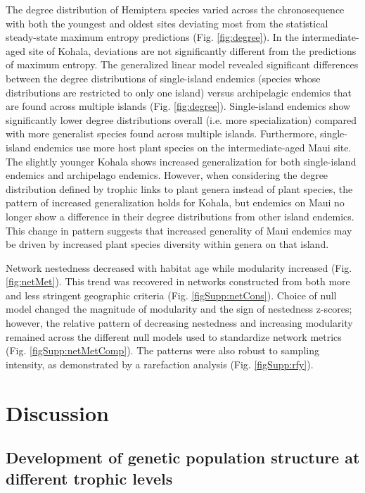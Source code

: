 The degree distribution of Hemiptera species varied across the
chronosequence with both the youngest and oldest sites deviating most
from the statistical steady-state maximum entropy predictions
(Fig. \ref{fig:degree}). In the intermediate-aged site of Kohala,
deviations are not significantly different from the predictions of
maximum entropy.  The generalized linear model revealed significant
differences between the degree distributions of single-island endemics
(species whose distributions are restricted to only one island) versus
archipelagic endemics that are found across multiple islands
(Fig. \ref{fig:degree}). Single-island endemics show significantly lower degree
distributions overall (i.e. more specialization) compared with more
generalist species found across multiple islands. Furthermore,
single-island endemics use more host plant species on the
intermediate-aged Maui site. The slightly younger Kohala shows
increased generalization for both single-island endemics and
archipelago endemics. However, when considering the degree
distribution defined by trophic links to plant genera instead of plant
species, the pattern of increased generalization holds for Kohala, but
endemics on Maui no longer show a difference in their degree
distributions from other island endemics. This change in pattern
suggests that increased generality of Maui endemics may be driven by
increased plant species diversity within genera on that island.

Network nestedness decreased with habitat age while modularity
increased (Fig. \ref{fig:netMet}). This trend was recovered in
networks constructed from both more and less stringent geographic
criteria (Fig. \ref{figSupp:netCons}). Choice of null model changed
the magnitude of modularity and the sign of nestedness z-scores;
however, the relative pattern of decreasing nestedness and increasing
modularity remained across the different null models used to
standardize network metrics (Fig. \ref{figSupp:netMetComp}). The
patterns were also robust to sampling intensity, as demonstrated by a
rarefaction analysis (Fig. \ref{figSupp:rfy}).

\section{Discussion}

\subsection{Development of genetic population structure at different
trophic levels}

